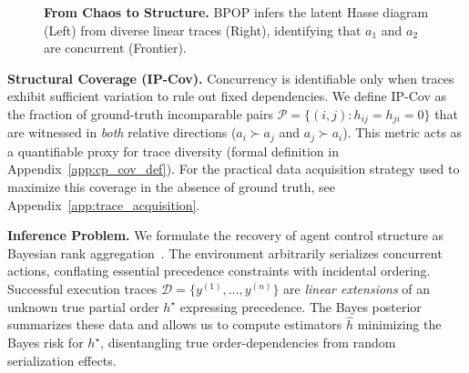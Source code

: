 \documentclass{article}
\theoremstyle{plain}
\theoremstyle{definition}
\theoremstyle{remark}
\begin{document}
\begin{figure}[t!]
  \vspace{-2mm}
  \caption{\textbf{From Chaos to Structure.} BPOP infers the latent Hasse diagram (Left) from diverse linear traces (Right), identifying that $a_1$ and $a_2$ are concurrent (Frontier).}
  \label{fig:poset-dag-hasse-le}
  \vspace{-1.5em}
\end{figure}

\noindent \textbf{Structural Coverage (IP-Cov).}
Concurrency is identifiable only when traces exhibit sufficient variation to rule out fixed dependencies. We define IP-Cov as the fraction of ground-truth incomparable pairs $\mathcal{P}=\{(i,j): h_{ij}=h_{ji}=0\}$ that are witnessed in \emph{both} relative directions ($a_i \succ a_j$ and $a_j \succ a_i$). This metric acts as a quantifiable proxy for trace diversity (formal definition in Appendix~\ref{app:cp_cov_def}). For the practical data acquisition strategy used to maximize this coverage in the absence of ground truth, see Appendix~\ref{app:trace_acquisition}.

\noindent \textbf{Inference Problem.}
We formulate the recovery of agent control structure as Bayesian rank aggregation~\citep{nicholls2024bayesianinferencepartialorders}.
The environment arbitrarily serializes concurrent actions, conflating essential precedence constraints with incidental ordering. Successful execution traces $\mathcal{D}=\{y^{(1)},\dots,y^{(n)}\}$ are
\emph{linear extensions} of an unknown true partial order $h^\star$ expressing precedence.
The Bayes posterior summarizes these data and allows us to compute estimators $\widehat{h}$ minimizing the Bayes risk for $h^\star$, disentangling true order-dependencies from random serialization effects.
\end{document}
